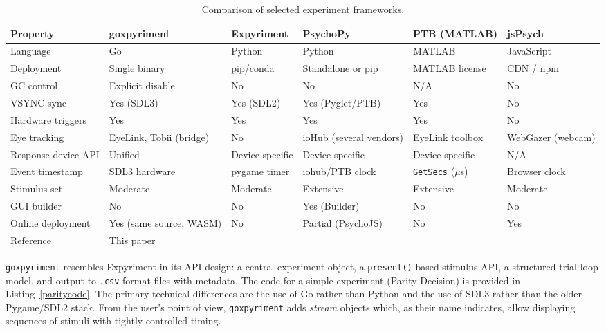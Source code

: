 \documentclass[doc,a4paper,floatsintext]{apa7}
\begin{document}
\begin{table}[tb]
\caption{Comparison of selected experiment frameworks.}
\label{tab:comparison}
\footnotesize
\begin{tabular}{@{}
  >{\raggedright\arraybackslash}p{}
  >{\raggedright\arraybackslash}p{}
  >{\raggedright\arraybackslash}p{}
  >{\raggedright\arraybackslash}p{}
  >{\raggedright\arraybackslash}p{}
  >{\raggedright\arraybackslash}p{}@{}}
\toprule
Property & goxpyriment & Expyriment & PsychoPy & PTB (MATLAB) & jsPsych \\
\midrule
Language        & Go           & Python        & Python            & MATLAB           & JavaScript \\
Deployment      & Single binary & pip/conda    & Standalone or pip & MATLAB license   & CDN / npm \\
GC control      & Explicit disable & No        & No                & N/A              & No \\
VSYNC sync      & Yes (SDL3)   & Yes (SDL2)    & Yes (Pyglet/PTB)  & Yes              & No \\
Hardware triggers & Yes        & Yes           & Yes               & Yes              & No \\
Eye tracking    & EyeLink, Tobii (bridge) & No & ioHub (several vendors) & EyeLink toolbox & WebGazer (webcam) \\
Response device API & Unified  & Device-specific & Device-specific & Device-specific & N/A \\
Event timestamp & SDL3 hardware & pygame timer & iohub/PTB clock  & \texttt{GetSecs} ($\mu$s) & Browser clock \\
Stimulus set    & Moderate     & Moderate      & Extensive         & Extensive        & Moderate \\
GUI builder     & No           & No            & Yes (Builder)     & No               & No \\
Online deployment & Yes (same source, WASM) & No & Partial (PsychoJS) & No           & Yes \\
Reference       & This paper   & \cite{krause2014} & \cite{peirce2019} & \cite{brainard1997} & \cite{deleeuw2023} \\
\bottomrule
\end{tabular}
\end{table}

\texttt{goxpyriment} resembles Expyriment in its API design: a central
experiment object, a \texttt{present()}-based stimulus API, a
structured trial-loop model, and output to \texttt{.csv}-format files
with metadata. The code for a simple experiment (Parity Decision) is
provided in Listing~\ref{paritycode}. The primary technical differences
are the use of Go rather than Python and the use of SDL3 rather than
the older Pygame/SDL2 stack. From the user's point of view,
\texttt{goxpyriment} adds \emph{stream} objects which, as their name
indicates, allow displaying sequences of stimuli with tightly
controlled timing.
\end{document}
